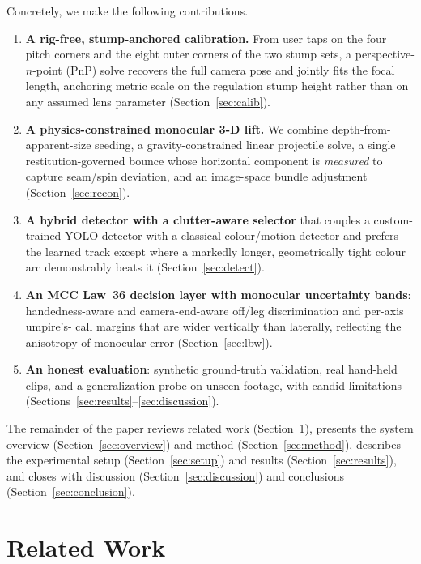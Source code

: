 \documentclass[journal]{IEEEtran}
\begin{document}
Concretely, we make the following contributions.
\begin{enumerate}
\item \textbf{A rig-free, stump-anchored calibration.} From user taps on the
four pitch corners and the eight outer corners of the two stump sets, a
perspective-$n$-point (PnP) solve recovers the full camera pose and jointly
fits the focal length, anchoring metric scale on the regulation stump height
rather than on any assumed lens parameter (Section~\ref{sec:calib}).
\item \textbf{A physics-constrained monocular 3-D lift.} We combine
depth-from-apparent-size seeding, a gravity-constrained linear projectile solve,
a single restitution-governed bounce whose horizontal component is
\emph{measured} to capture seam/spin deviation, and an image-space bundle
adjustment (Section~\ref{sec:recon}).
\item \textbf{A hybrid detector with a clutter-aware selector} that couples a
custom-trained YOLO detector with a classical colour/motion detector and prefers
the learned track except where a markedly longer, geometrically tight colour arc
demonstrably beats it (Section~\ref{sec:detect}).
\item \textbf{An MCC Law~36 decision layer with monocular uncertainty bands}:
handedness-aware and camera-end-aware off/leg discrimination and per-axis umpire's-
call margins that are wider vertically than laterally, reflecting the anisotropy
of monocular error (Section~\ref{sec:lbw}).
\item \textbf{An honest evaluation}: synthetic ground-truth validation, real
hand-held clips, and a generalization probe on unseen footage, with candid
limitations (Sections~\ref{sec:results}--\ref{sec:discussion}).
\end{enumerate}

The remainder of the paper reviews related work
(Section~\ref{sec:related}), presents the system overview
(Section~\ref{sec:overview}) and method (Section~\ref{sec:method}), describes the
experimental setup (Section~\ref{sec:setup}) and results
(Section~\ref{sec:results}), and closes with discussion
(Section~\ref{sec:discussion}) and conclusions (Section~\ref{sec:conclusion}).

\section{Related Work}
\label{sec:related}
\end{document}
